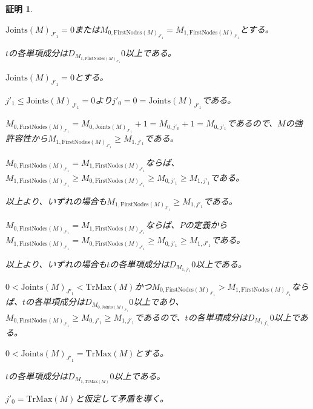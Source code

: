 \documentclass[dvipdfmx,uplatex]{jsarticle}
\theoremstyle{customnonumberbreakfortheorem}
\theoremstyle{customnonumberbreakforproof}
\newtheorem{hideableproof}{証明}
\begin{document}
\begin{hideableproof}
\begin{indented}
\begin{indented}
\begin{penumerate}
				\setcounter{penumeratei}{1}
				\item \(\textrm{Joints}(M)_{J'_1} = 0\)または\(M_{0,\textrm{FirstNodes}(M)_{J'_1}} = M_{1,\textrm{FirstNodes}(M)_{J'_1}}\)とする。
				\begin{indented}
					\item \(t\)の各単項成分は\(D_{M_{1,\textrm{FirstNodes}(M)_{J'_1}}} 0\)以上である。
					\item \(\textrm{Joints}(M)_{J'_1} = 0\)とする。
					\begin{indented}
						\item \(j'_1 \leq \textrm{Joints}(M)_{J'_1} = 0\)より\(j'_0 = 0 = \textrm{Joints}(M)_{J'_1}\)である。
						\item \(M_{0,\textrm{FirstNodes}(M)_{J'_1}} = M_{0,\textrm{Joints}(M)_{J'_1}}+1 = M_{0,j'_0}+1 = M_{0,j'_1}\)であるので、\(M\)の強許容性から\(M_{1,\textrm{FirstNodes}(M)_{J'_1}} \geq M_{1,j'_1}\)である。
						\item \(M_{0,\textrm{FirstNodes}(M)_{J'_1}} = M_{1,\textrm{FirstNodes}(M)_{J'_1}}\)ならば、\(M_{1,\textrm{FirstNodes}(M)_{J'_1}} \geq M_{0,\textrm{FirstNodes}(M)_{J'_1}} \geq M_{0,j'_1} \geq M_{1,j'_1}\)である。
						\item 以上より、いずれの場合も\(M_{1,\textrm{FirstNodes}(M)_{J'_1}} \geq M_{1,j'_1}\)である。
					\end{indented}
					\item \(M_{0,\textrm{FirstNodes}(M)_{J'_1}} = M_{1,\textrm{FirstNodes}(M)_{J'_1}}\)ならば、\(P\)の定義から\(M_{1,\textrm{FirstNodes}(M)_{J'_1}} = M_{0,\textrm{FirstNodes}(M)_{J'_1}} \geq M_{0,j'_1} \geq M_{1,J'_1}\)である。
					\item 以上より、いずれの場合も\(t\)の各単項成分は\(D_{M_{1,j'_1}} 0\)以上である。
				\end{indented}
				\item \(0 < \textrm{Joints}(M)_{J'_1} < \textrm{TrMax}(M)\)かつ\(M_{0,\textrm{FirstNodes}(M)_{J'_1}} > M_{1,\textrm{FirstNodes}(M)_{J'_1}}\)ならば、\(t\)の各単項成分は\(D_{M_{0,\textrm{Joints}(M)_{J'_1}}} 0\)以上であり、\(M_{0,\textrm{FirstNodes}(M)_{J'_1}} \geq M_{0,j'_1} \geq M_{1,j'_1}\)であるので、\(t\)の各単項成分は\(D_{M_{1,j'_1}} 0\)以上である。
				\item \(0 < \textrm{Joints}(M)_{J'_1} = \textrm{TrMax}(M)\)とする。
				\begin{indented}
					\item \(t\)の各単項成分は\(D_{M_{1,\textrm{TrMax}(M)}} 0\)以上である。
					\item \(j'_0 = \textrm{TrMax}(M)\)と仮定して矛盾を導く。

\end{indented}
\end{penumerate}
\end{indented}
\end{indented}
\end{hideableproof}
\end{document}
